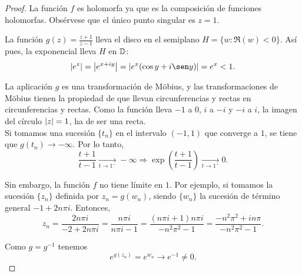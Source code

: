 \begin{proof}
    La función $f$ es holomorfa ya que es la composición de funciones holomorfas. Obsérvese que el único punto singular es $z = 1$.

    La función $g(z) = \frac{z + 1}{z - 1}$ lleva el disco en el semiplano $H = \{w: \Re (w) < 0\}$. Así pues, la exponencial lleva $H$ en $\mathbb{D}$:
    \begin{equation*}
        \abs{e^z} = \abs{e^{x+iy}} = \abs{e^{x}(\cos y + i\sen y)} = e^{x} < 1.
    \end{equation*}

    La aplicación $g$ es una transformación de Möbius, y las transformaciones de Möbius tienen la propiedad de que llevan circunferencias y rectas en circunferencias y rectas. Como la función lleva $-1$ a $0$, $i$ a $-i$ y $-i$ a $i$, la imagen del círculo $\left\lvert z\right\rvert=1$, ha de ser una recta. \\

    Si tomamos una sucesión $\{t_n\}$ en el intervalo $(-1,1)$ que converge a $1$, se tiene que $g(t_n) \to - \infty$. Por lo tanto,
    \begin{equation*}
        \frac{t + 1}{t - 1} \xrightarrow[t \rightarrow 1^-]{}  - \infty \Rightarrow \exp \left(  \frac{t + 1}{t - 1} \right) \xrightarrow[t \rightarrow 1^-]{} 0.
    \end{equation*}

    Sin embargo, la función $f$ no tiene límite en $1$. Por ejemplo, si tomamos la sucesión $\{z_n\}$ definida por $z_n = g(w_n)$, siendo $\{w_n\}$ la sucesión de término general $-1 + 2n \pi i$. Entonces,
     \begin{equation*}
         z_n = \frac{2n \pi i}{-2 + 2n \pi i} = \frac{n \pi i}{n \pi i - 1} =  \frac{(n \pi i + 1) n \pi i}{- n^2 \pi^2 - 1} = \frac{-n^2 \pi^2 + i n \pi}{-n^2 \pi^2 - 1}.
     \end{equation*}

     Como $g = g^{-1}$ tenemos
     \begin{equation*}
         e^{g(z_n)} = e^{w_n} \rightarrow e^{-1} \not = 0.
     \end{equation*}

\end{proof}
